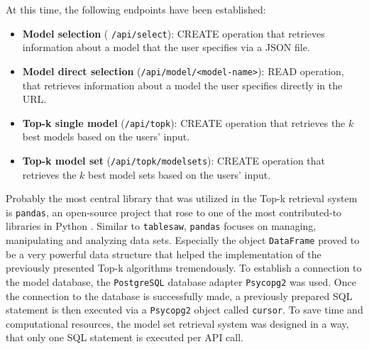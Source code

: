 At this time, the following endpoints have been established:


\begin{itemize}

\item \textbf{Model selection} ( \texttt{/api/select}): CREATE operation that retrieves information about a model that the user specifies via a JSON file. 
\item \textbf{Model direct selection} (\texttt{/api/model/<model-name>}): READ operation, that retrieves information about a model the user specifies directly in the URL.
\item \textbf{Top-k single model} (\texttt{/api/topk}): CREATE operation that retrieves the $k$ best models based on the users' input.
\item \textbf{Top-k model set} (\texttt{/api/topk/modelsets}): CREATE operation that retrieves the $k$ best model sets based on the users' input.
\end{itemize}


Probably the most central library that was utilized in the Top-k retrieval system is \texttt{pandas}, an open-source project that rose to one of the most contributed-to libraries in Python \cite{mckinney2022}. Similar to \texttt{tablesaw}, \texttt{pandas} focuses on managing, manipulating and analyzing data sets. Especially the object \texttt{DataFrame} proved to be a very powerful data structure that helped the implementation of the previously presented Top-k algorithms tremendously. To establish a connection to the model database, the \texttt{PostgreSQL} database adapter \texttt{Psycopg2} was used. Once the connection to the database is successfully made, a previously prepared SQL statement is then executed via a \texttt{Psycopg2} object called \texttt{cursor}. To save time and computational resources, the model set retrieval system was designed in a way, that only one SQL statement is executed per API call. 

